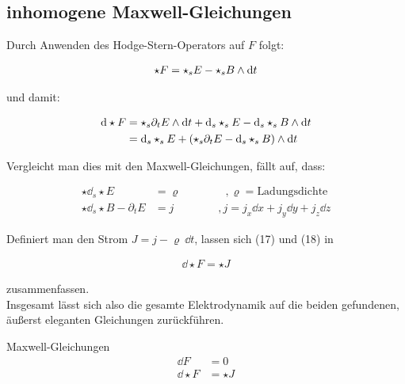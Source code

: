 \subsection{inhomogene Maxwell-Gleichungen}
Durch Anwenden des Hodge-Stern-Operators auf $F$ folgt:

\begin{align}
\star F = \star_s E - \star_s B \wedge \dd t 
\end{align}

und damit:

\begin{align}
\dd \star F &= \star_s \partial_t E  \wedge \dd t + \dd_s \star_s E - \dd_s \star_s B \wedge \dd t \notag \\
				&= \dd_s \star_s E + (\star_s \partial_t E - \dd_s \star_s B) \wedge \dd t 
\end{align}

Vergleicht man dies mit den Maxwell-Gleichungen, fällt auf, dass:

\begin{align}
\star \dd_s \star E &= \varrho \qquad\qquad,\varrho=\text{Ladungsdichte} \\
\star \dd_s\star B - \partial_t E &= j \qquad\qquad ,j=j_x \dd x + j_y \dd y + j_z \dd z
\end{align}

Definiert man den Strom $J=j - \varrho \  \dd t$, lassen sich (17) und (18) in 

\begin{align}
\dd \star F = \star J
\end{align}

zusammenfassen. \\

Insgesamt lässt sich also die gesamte Elektrodynamik auf die beiden gefundenen, äußerst eleganten Gleichungen zurückführen.

\begin{mybox}{Maxwell-Gleichungen}
\begin{align*}
\dd F &= 0 \\
\dd \star F &= \star J
\end{align*}
\end{mybox}
